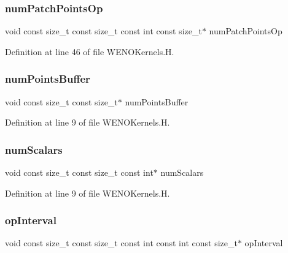 \subsubsection{\texorpdfstring{num\+Patch\+Points\+Op}{numPatchPointsOp}}
{\footnotesize\ttfamily void const size\+\_\+t const size\+\_\+t const int const size\+\_\+t$\ast$ num\+Patch\+Points\+Op}



Definition at line 46 of file W\+E\+N\+O\+Kernels.\+H.

\hypertarget{WENOKernels_8H_a86c25ff33e6d9bccfabdf45dc5ddf24c}{}\label{WENOKernels_8H_a86c25ff33e6d9bccfabdf45dc5ddf24c} 
\subsubsection{\texorpdfstring{num\+Points\+Buffer}{numPointsBuffer}}
{\footnotesize\ttfamily void const size\+\_\+t const size\+\_\+t$\ast$ num\+Points\+Buffer}



Definition at line 9 of file W\+E\+N\+O\+Kernels.\+H.

\hypertarget{WENOKernels_8H_a653618c9ce0046e8ef3b30321ea41f98}{}\label{WENOKernels_8H_a653618c9ce0046e8ef3b30321ea41f98} 
\subsubsection{\texorpdfstring{num\+Scalars}{numScalars}}
{\footnotesize\ttfamily void const size\+\_\+t const size\+\_\+t const int$\ast$ num\+Scalars}



Definition at line 9 of file W\+E\+N\+O\+Kernels.\+H.

\hypertarget{WENOKernels_8H_a23d86f4608a92738225f87574392b273}{}\label{WENOKernels_8H_a23d86f4608a92738225f87574392b273} 
\subsubsection{\texorpdfstring{op\+Interval}{opInterval}}
{\footnotesize\ttfamily void const size\+\_\+t const size\+\_\+t const int const int const size\+\_\+t$\ast$ op\+Interval}



